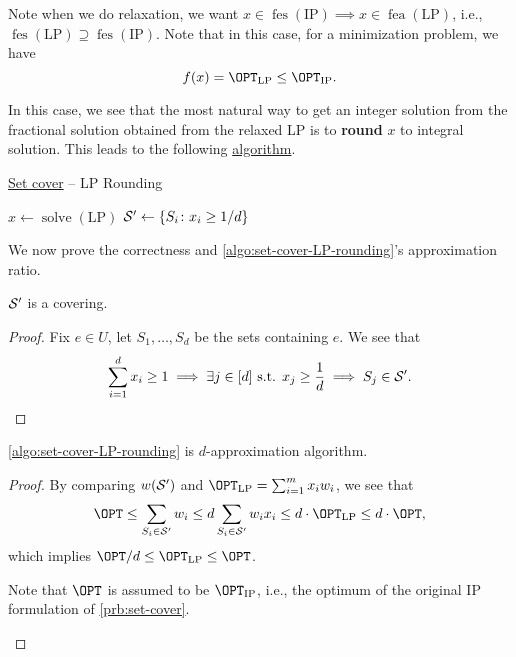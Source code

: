 \begin{note}
	Note when we do relaxation, we want \(x\in \mathop{\mathrm{fes}}(\text{IP}) \implies x\in \mathop{\mathrm{fea}}(\text{LP})\), i.e., \(\mathop{\mathrm{fes}}(\text{LP})\supseteq \mathop{\mathrm{fes}}(\text{IP})\). Note that in this case, for a minimization problem, we have
	\[
		f(x) = \OPT_\text{LP} \leq \OPT_\text{IP}.
	\]
\end{note}

In this case, we see that the most natural way to get an integer solution from the fractional solution obtained from the relaxed LP is to \textbf{round} \(x\) to integral solution. This leads to the following \hyperref[algo:set-cover-LP-rounding]{algorithm}.

\par
\begin{algorithm}[H]\label{algo:set-cover-LP-rounding}
	\DontPrintSemicolon
	\caption{\hyperref[prb:set-cover]{Set cover} -- LP Rounding}
	\BlankLine
	\(x\gets\mathop{\mathrm{solve}}(\text{LP})\)
	\(\mathcal{\MakeUppercase{S}} ^\prime \gets \left\{ S_i \colon x_{i} \geq 1 / d \right\}\)\;
	\;
\end{algorithm}

We now prove the correctness and \autoref{algo:set-cover-LP-rounding}'s approximation ratio.
\begin{lemma}
	\(\mathcal{\MakeUppercase{S}} ^\prime \) is a covering.
\end{lemma}
\begin{proof}
	Fix \(e\in U\), let \(S_1, \ldots  , S_d\) be the sets containing \(e\). We see that
	\[
		\sum_{i=1}^{d} x_{i} \geq 1\implies \exists j\in[d] \text{ s.t. } x_j \geq \frac{1}{d} \implies S_j\in \mathcal{\MakeUppercase{S}} ^\prime.
	\]
\end{proof}

\begin{theorem}\label{thm:lec2-1}
	\autoref{algo:set-cover-LP-rounding} is \(d\)-approximation algorithm.
\end{theorem}
\begin{proof}
	By comparing \(w(\mathcal{\MakeUppercase{S}} ^\prime )\) and \(\OPT_\text{LP} = \sum_{i=1}^{m} x_{i} w_{i}\), we see that
	\[
		\OPT \leq \sum_{S_i\in \mathcal{\MakeUppercase{S}} ^\prime }w_i \leq d \sum_{S_i\in \mathcal{\MakeUppercase{S}} ^\prime }w_{i} x_{i} \leq d\cdot \OPT_\text{LP} \leq d\cdot \OPT,
	\]
	which implies \(\OPT / d\leq \OPT_\text{LP} \leq \OPT\).

	\begin{note}
		Note that \(\OPT\) is assumed to be \(\OPT_{\text{IP}}\), i.e., the optimum of the original IP formulation of \autoref{prb:set-cover}.
	\end{note}
\end{proof}

